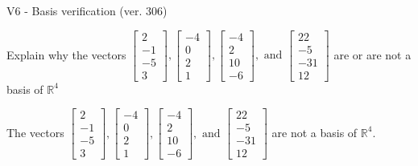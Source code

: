 \begin{exercise}
  \begin{exerciseTitle}V6 - Basis verification (ver. 306)\end{exerciseTitle}
  \begin{exerciseStatement}
    Explain why the vectors \(\left[\begin{array}{r}
2 \\
-1 \\
-5 \\
3
\end{array}\right] , \left[\begin{array}{r}
-4 \\
0 \\
2 \\
1
\end{array}\right] , \left[\begin{array}{r}
-4 \\
2 \\
10 \\
-6
\end{array}\right] , \text{ and } \left[\begin{array}{r}
22 \\
-5 \\
-31 \\
12
\end{array}\right]\) are or are not a basis of \(\mathbb{R}^4\)	


  \end{exerciseStatement}
  \begin{exerciseAnswer}
   The vectors \(\left[\begin{array}{r}
2 \\
-1 \\
-5 \\
3
\end{array}\right] , \left[\begin{array}{r}
-4 \\
0 \\
2 \\
1
\end{array}\right] , \left[\begin{array}{r}
-4 \\
2 \\
10 \\
-6
\end{array}\right] , \text{ and } \left[\begin{array}{r}
22 \\
-5 \\
-31 \\
12
\end{array}\right]\) 
  	 are not  a basis of \(\mathbb{R}^4\).
  


  \end{exerciseAnswer}
\end{exercise}